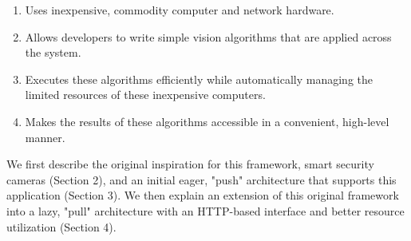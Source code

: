 \begin{enumerate}
    \setlength{\itemsep}{5pt}
    \item Uses inexpensive, commodity computer and network hardware.
    \item Allows developers to write simple vision algorithms that are applied across the system.
    \item Executes these algorithms efficiently while automatically managing the limited resources of these inexpensive computers.
    \item Makes the results of these algorithms accessible in a convenient, high-level manner.
\end{enumerate}

We first describe the original inspiration for this framework, smart security cameras
(Section 2), and an initial eager, "push" architecture that supports this application (Section 3).
We then explain an extension of this original framework into a lazy, "pull" architecture with an
HTTP-based interface and better resource utilization (Section 4).